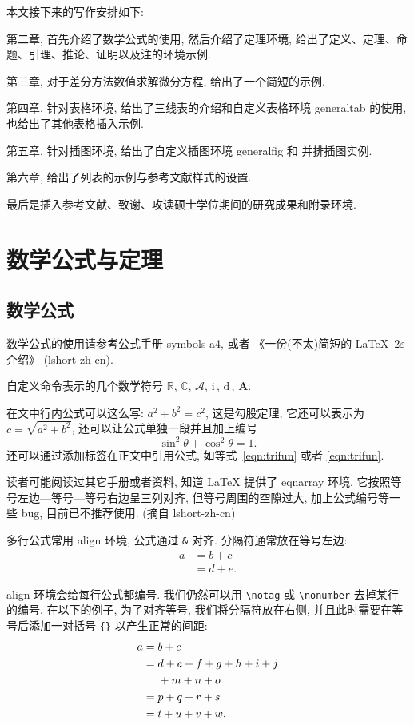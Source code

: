 \documentclass{shnuthesis}
\newcommand{\CC}{\ensuremath{\mathbb{C}}}
\newcommand{\RR}{\ensuremath{\mathbb{R}}}
\newcommand{\A}{\mathcal{A}}
\newcommand{\ii}{\bm{\mathrm{i}}\,}  %
\newcommand{\md}{\mathrm{d}\,}
\newcommand{\bA}{\boldsymbol{A}}
\begin{document}
本文接下来的写作安排如下:

第二章, 首先介绍了数学公式的使用, 然后介绍了定理环境, 给出了定义、定理、命题、引理、推论、证明以及注的环境示例.

第三章, 对于差分方法数值求解微分方程, 给出了一个简短的示例.

第四章, 针对表格环境, 给出了三线表的介绍和自定义表格环境 generaltab 的使用, 也给出了其他表格插入示例.

第五章, 针对插图环境, 给出了自定义插图环境 generalfig 和 并排插图实例.

第六章, 给出了列表的示例与参考文献样式的设置.

最后是插入参考文献、致谢、攻读硕士学位期间的研究成果和附录环境.




\chapter{数学公式与定理}

\section{数学公式}

数学公式的使用请参考公式手册 symbols-a4, 或者 《一份(不太)简短的 \LaTeX~2$\varepsilon$ 介绍》 (lshort-zh-cn).

自定义命令表示的几个数学符号 $\RR$, $\CC$, $\A$, $\ii$, $\md$, $\bA$.

在文中行内公式可以这么写: $a^2+b^2=c^2$, 这是勾股定理, 它还可以表示为 $c=\sqrt{a^2+b^2}$, 还可以让公式单独一段并且加上编号
\begin{equation}\label{eqn:trifun}
\sin^2{\theta}+\cos^2{\theta}=1.
\end{equation}
还可以通过添加标签在正文中引用公式, 如等式~\eqref{eqn:trifun} 或者 \ref{eqn:trifun}.

读者可能阅读过其它手册或者资料, 知道 LaTeX 提供了 eqnarray 环境. 它按照等号左边—等号—等号右边呈三列对齐, 但等号周围的空隙过大, 加上公式编号等一些 bug, 目前已不推荐使用. (摘自 lshort-zh-cn)

多行公式常用 align 环境, 公式通过 \verb|&| 对齐. 分隔符通常放在等号左边:
\begin{align}
a & = b + c \\
& = d + e.
\end{align}

align 环境会给每行公式都编号. 我们仍然可以用 \verb|\notag| 或 \verb|\nonumber| 去掉某行的编号. 在以下的例子,
为了对齐等号, 我们将分隔符放在右侧, 并且此时需要在等号后添加一对括号 \verb|{}| 以产生正常的间距:
\begin{align}
a ={} & b + c \\
={} & d + e + f + g + h + i + j \notag \\
& + m + n + o \\
={} & p + q + r + s \\
={} & t + u + v + w.
\end{align}
\end{document}
